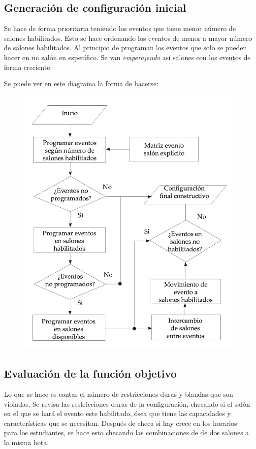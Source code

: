 \documentclass[12pt,letterpaper]{article}
\begin{document}
\subsection{Generación de configuración inicial}
Se hace de forma prioritaria teniendo los eventos que tiene menor número de salones habilitados.
Esto se hace ordenando los eventos de menor a mayor número de salones habilitados. Al principio
de programan los eventos que solo se pueden hacer en un salón en específico. Se van
\textit{emperajendo} así salones con los eventos de forma creciente.

Se puede ver en este diagrama la forma de hacerse:
\begin{figure}[H]
	\centering
		\includegraphics[scale=0.4]{assets/1.png}
\end{figure}

\subsection{Evaluación de la función objetivo}
Lo que se hace es contar el número de restricciones duras y blandas que son violadas.
Se revisa las restricciones duras de la configuración, checando si el salón en el que se hará
el evento este habilitado, ósea que tiene las capacidades y características que se necesitan.
Después de checa si hay crece en los horarios para los estudiantes, se hace esto checando
las combinaciones de de dos salones a la misma hota.
\end{document}
